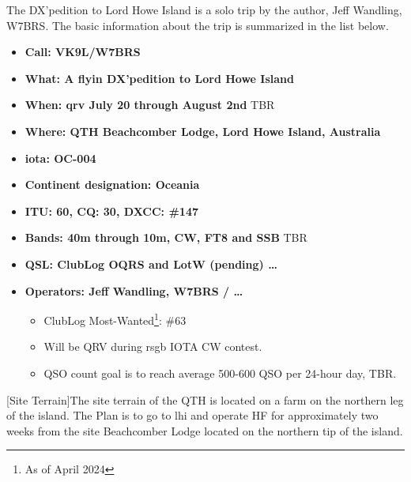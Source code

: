 \documentclass[11pt]{article}
\begin{document}
The DX'pedition to Lord Howe Island is a solo trip by the author, Jeff
Wandling, W7BRS.  The basic information about the trip is summarized
in the list below.

\begin{itemize}
\item {\textbf{Call: VK9L/W7BRS}}
\item {\textbf{What: A {\gls{flyin}} DX'pedition to Lord Howe Island}}
\item {\textbf{When: {\gls{qrv}} July 20 through August 2nd}} TBR
\item {\textbf{Where: QTH Beachcomber Lodge, Lord Howe Island, Australia}}
\item {\textbf{{\gls{iota}}: OC-004}}
\item {\textbf{Continent designation: Oceania}}
\item {\textbf{ITU: 60, CQ: 30, DXCC: \#147}}
\item {\textbf{Bands: 40m through 10m, CW, FT8 and SSB}}  TBR
\item {\textbf{QSL: ClubLog OQRS and LotW (pending)  \ldots}}
\item {\textbf{Operators: Jeff Wandling, W7BRS /  \ldots}}
\begin{itemize}
    \item ClubLog Most-Wanted\footnote{As of April 2024}: \#63
    \item Will be QRV during {\gls{rsgb}} IOTA CW contest.
    \item QSO count goal is to reach average 500-600 QSO per 24-hour day, TBR.
\end{itemize}
\end{itemize}
\par

\vskip2mm
\noindent%
\begin{minipage}{\linewidth}%
\captionsetup{width=0.8\linewidth}
[Site Terrain]{The site terrain of the QTH is located
on a farm on the northern leg of the island.
The Plan is to go to {\gls{lhi}} and operate HF for approximately
two weeks from the site Beachcomber Lodge located on the northern
tip of the island.}
\label{farm}
\end{minipage}
\newpage
\vskip4mm
\end{document}
